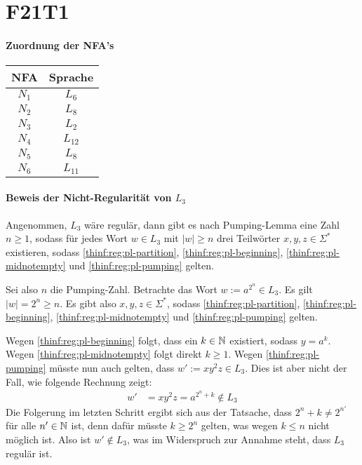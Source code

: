 \section{F21T1}


\paragraph{Zuordnung der NFA's}
\begin{tabular}{|c|c|}
	\hline
	NFA & Sprache \\
	\hline
	$N_1$ & $L_6$ \\
	\hline
	$N_2$ & $L_8$ \\
	\hline
	$N_3$ & $L_2$ \\
	\hline
	$N_4$ & $L_12$ \\
	\hline
	$N_5$ & $L_8$ \\
	\hline
	$N_6$ & $L_11$ \\
	\hline
\end{tabular}
\par

\paragraph{Beweis der Nicht-Regularität von $L_3$}
Angenommen, $L_3$ wäre regulär, dann gibt es nach Pumping-Lemma eine Zahl $n
\geq 1$, sodass für jedes Wort $w \in L_3$ mit $|w| \geq n$ drei Teilwörter
$x,y,z \in \Sigma^*$ existieren, sodass \eqref{thinf:reg:pl-partition},
\eqref{thinf:reg:pl-beginning}, \eqref{thinf:reg:pl-midnotempty} und
\eqref{thinf:reg:pl-pumping} gelten.

Sei also $n$ die Pumping-Zahl. Betrachte das Wort $w := a^{2^n} \in L_3$. Es
gilt $|w| = 2^n \geq n$. Es gibt also $x,y,z \in \Sigma^*$, sodass
\eqref{thinf:reg:pl-partition}, \eqref{thinf:reg:pl-beginning},
\eqref{thinf:reg:pl-midnotempty} und \eqref{thinf:reg:pl-pumping} gelten.

Wegen \eqref{thinf:reg:pl-beginning} folgt, dass ein $k \in \mathbb{N}$ existiert,
sodass $y = a^k$. Wegen \eqref{thinf:reg:pl-midnotempty} folgt direkt $k \geq
1$. Wegen \eqref{thinf:reg:pl-pumping} müsste nun auch gelten, dass $w' := xy^2z
\in L_3$. Dies ist aber nicht der Fall, wie folgende Rechnung zeigt:
\begin{align*}
	w'
	& = xy^2z
	= a^{2^n + k} \notin L_3
\end{align*}
Die Folgerung im letzten Schritt ergibt sich aus der Tatsache, dass $2^n + k
\neq 2^{n'}$ für alle $n' \in \mathbb{N}$ ist, denn dafür müsste $k \geq 2^n$ gelten,
was wegen $k \leq n$ nicht möglich ist. Also ist $w' \notin L_3$, was im
Widerspruch zur Annahme steht, dass $L_3$ regulär ist.
\par


